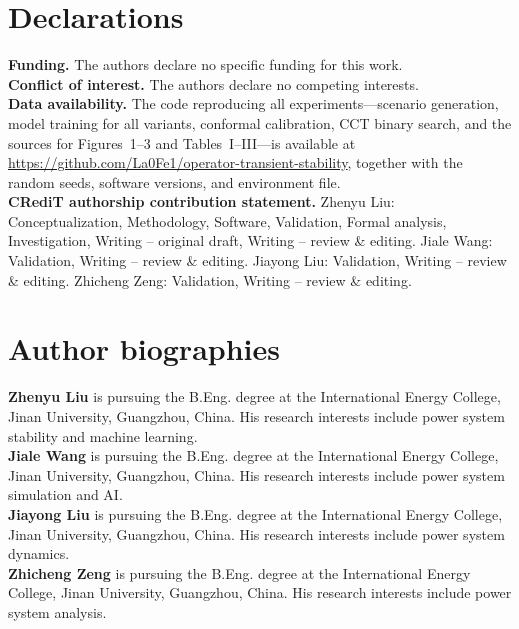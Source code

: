 \documentclass[5p,times]{elsarticle}
\begin{document}
\section*{Declarations}
\noindent\textbf{Funding.} The authors declare no specific funding for this work.\\
\textbf{Conflict of interest.} The authors declare no competing interests.\\
\textbf{Data availability.} The code reproducing all experiments---scenario generation,
model training for all variants, conformal calibration, CCT binary search, and the sources for
Figures~1--3 and Tables~I--III---is available at
\url{https://github.com/La0Fe1/operator-transient-stability}, together with the random seeds,
software versions, and environment file.\\
\textbf{CRediT authorship contribution statement.} Zhenyu Liu: Conceptualization, Methodology,
Software, Validation, Formal analysis, Investigation, Writing -- original draft, Writing --
review \& editing. Jiale Wang: Validation, Writing -- review \& editing. Jiayong Liu: Validation,
Writing -- review \& editing. Zhicheng Zeng: Validation, Writing -- review \& editing.




\section*{Author biographies}
\noindent\textbf{Zhenyu Liu} is pursuing the B.Eng. degree at the International Energy College,
Jinan University, Guangzhou, China. His research interests include power system stability and
machine learning.\\
\textbf{Jiale Wang} is pursuing the B.Eng. degree at the International Energy College, Jinan
University, Guangzhou, China. His research interests include power system simulation and AI.\\
\textbf{Jiayong Liu} is pursuing the B.Eng. degree at the International Energy College, Jinan
University, Guangzhou, China. His research interests include power system dynamics.\\
\textbf{Zhicheng Zeng} is pursuing the B.Eng. degree at the International Energy College, Jinan
University, Guangzhou, China. His research interests include power system analysis.
\end{document}
